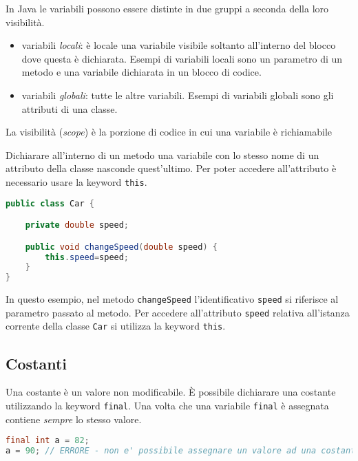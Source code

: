 \documentclass{article}
\begin{document}
In Java le variabili possono essere distinte in due gruppi a seconda della loro visibilità.

\begin{itemize}
\item variabili \emph{locali}: è locale una variabile visibile soltanto all'interno del blocco dove questa è dichiarata.
Esempi di variabili locali sono un parametro di un metodo e una variabile dichiarata in un blocco di codice.
\item variabili \emph{globali}: tutte le altre variabili. Esempi di variabili globali sono gli attributi di una classe.
\end{itemize}

\begin{mydef} La visibilità (\emph{scope}) è la porzione di codice in cui una variabile è richiamabile
\end{mydef}
Dichiarare all'interno di un metodo una variabile con lo stesso nome di un attributo della classe nasconde quest'ultimo.
Per poter accedere all'attributo è necessario usare la keyword \texttt{this}.
\begin{lstlisting}[language=Java,escapechar=|]
public class Car {

	private double speed;

	public void changeSpeed(double speed) {
	    this.speed=speed;   
   	}
}
\end{lstlisting}
In questo esempio, nel metodo \texttt{changeSpeed} l'identificativo \texttt{speed} si riferisce al parametro passato al metodo.
Per accedere all'attributo \texttt{speed} relativa all'istanza corrente della classe \texttt{Car} si utilizza la keyword \texttt{this}. 

\subsection{Costanti}
Una costante è un valore non modificabile.
È possibile dichiarare una costante utilizzando la keyword
\texttt{final}.  Una volta che una variabile \texttt{final} \`e assegnata contiene \emph{sempre} lo stesso valore.

\begin{lstlisting}[language=Java,escapechar=|]
final int a = 82;
a = 90; // ERRORE - non e' possibile assegnare un valore ad una costante
\end{lstlisting}
\end{document}
